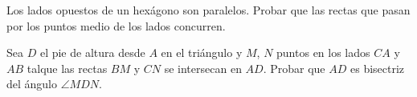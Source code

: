 \begin{section-problem}
    Los lados opuestos de un hexágono son paralelos.
    Probar que las rectas que pasan por los puntos medio de los lados concurren.
\end{section-problem}

\begin{section-problem}
    Sea $D$ el pie de altura desde $A$ en el triángulo  y $M$, $N$ puntos en los lados $CA$ y $AB$ talque las rectas $BM$ y $CN$ se intersecan en $AD$.
    Probar que $AD$ es bisectriz del ángulo $\angle MDN$.
\end{section-problem}